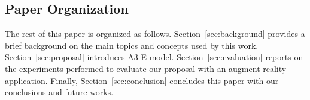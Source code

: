 
\subsection{Paper Organization}

The rest of this paper is organized as follows. Section~\ref{sec:background} provides a brief background on the main topics and concepts used by this work. Section~\ref{sec:proposal} introduces A3-E model. Section~\ref{sec:evaluation} reports on the experiments performed to evaluate our proposal with an augment reality application. Finally, Section~\ref{sec:conclusion} concludes this paper with our conclusions and future works.




